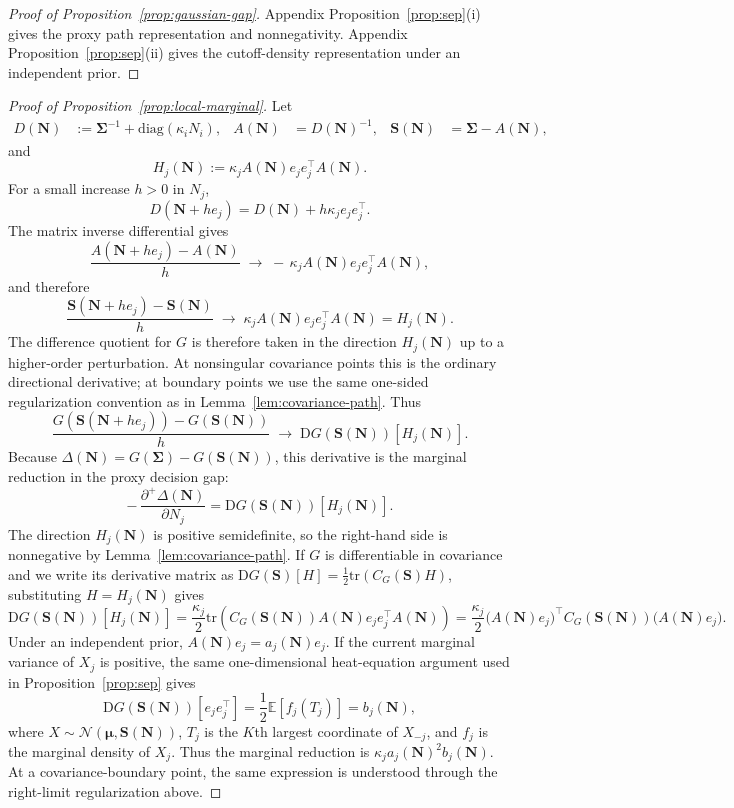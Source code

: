 \documentclass[11pt]{article}
\theoremstyle{definition}
\theoremstyle{remark}
\newcommand{\E}{\mathbb{E}}
\newcommand{\1}{\mathbf{1}}
\newcommand{\trace}{\mathrm{tr}}
\newcommand{\diag}{\mathrm{diag}}
\newcommand{\Normal}{\mathcal{N}}
\newcommand{\bmu}{\boldsymbol{\mu}}
\newcommand{\bSigma}{\boldsymbol{\Sigma}}
\newcommand{\N}{\mathbf{N}}
\newcommand{\bS}{\mathbf{S}}
\begin{document}
\medskip

\begin{proof}[Proof of Proposition~\ref{prop:gaussian-gap}]
Appendix Proposition~\ref{prop:sep}(i) gives the proxy path
representation and nonnegativity. Appendix Proposition~\ref{prop:sep}(ii)
gives the cutoff-density representation under an independent prior.
\end{proof}

\begin{proof}[Proof of Proposition~\ref{prop:local-marginal}]
Let
\[
\begin{aligned}
D(\N)&:=\bSigma^{-1}+\diag(\kappa_iN_i),
&
A(\N)&=D(\N)^{-1},
&
\bS(\N)&=\bSigma-A(\N),
\end{aligned}
\]
and
\[
H_j(\N):=\kappa_j A(\N)e_j e_j^\top A(\N).
\]
For a small increase \(h>0\) in \(N_j\),
\[
D(\N+h e_j)=D(\N)+h\kappa_j e_j e_j^\top .
\]
The matrix inverse differential gives
\[
\frac{A(\N+h e_j)-A(\N)}{h}
\;\longrightarrow\;
-\,\kappa_j A(\N)e_j e_j^\top A(\N),
\]
and therefore
\[
\frac{\bS(\N+h e_j)-\bS(\N)}{h}
\;\longrightarrow\;
\kappa_j A(\N)e_j e_j^\top A(\N)=H_j(\N).
\]
The difference quotient for \(G\) is therefore taken in the direction
\(H_j(\N)\) up to a higher-order perturbation. At nonsingular covariance
points this is the ordinary directional derivative; at boundary points
we use the same one-sided regularization convention as in
Lemma~\ref{lem:covariance-path}. Thus
\[
\frac{G(\bS(\N+h e_j))-G(\bS(\N))}{h}
\;\longrightarrow\;
\mathrm{D}G(\bS(\N))[H_j(\N)].
\]
Because
\(\Delta(\N)=G(\bSigma)-G(\bS(\N))\), this derivative is the marginal
reduction in the proxy decision gap:
\[
-\,\frac{\partial^+\Delta(\N)}{\partial N_j}
=
\mathrm{D}G(\bS(\N))[H_j(\N)].
\]
The direction \(H_j(\N)\) is positive semidefinite, so the right-hand
side is nonnegative by Lemma~\ref{lem:covariance-path}. If \(G\) is
differentiable in covariance and we write its derivative matrix as
\(\mathrm{D}G(\bS)[H]=\frac12\trace(C_G(\bS)H)\), substituting
\(H=H_j(\N)\) gives
\[
\mathrm{D}G(\bS(\N))[H_j(\N)]
=
\frac{\kappa_j}{2}
\trace\!\left(C_G(\bS(\N))A(\N)e_j e_j^\top A(\N)\right)
=
\frac{\kappa_j}{2}
\big(A(\N)e_j\big)^\top C_G(\bS(\N))\big(A(\N)e_j\big).
\]
Under an independent prior, \(A(\N)e_j=a_j(\N)e_j\). If the current
marginal variance of \(X_j\) is positive, the same one-dimensional
heat-equation argument used in Proposition~\ref{prop:sep} gives
\[
\mathrm{D}G(\bS(\N))[e_j e_j^\top]
=
\frac12\E[f_j(T_j)]
=b_j(\N),
\]
where \(X\sim\Normal(\bmu,\bS(\N))\), \(T_j\) is the \(K\)th largest
coordinate of \(X_{-j}\), and \(f_j\) is the marginal density of
\(X_j\). Thus the marginal reduction is
\(\kappa_j a_j(\N)^2 b_j(\N)\). At a covariance-boundary point, the
same expression is understood through the right-limit regularization
above.
\end{proof}
\end{document}
